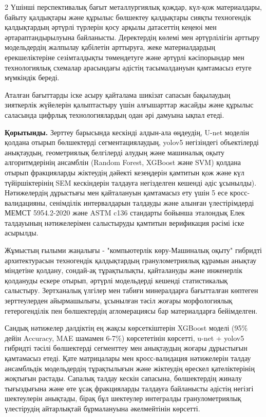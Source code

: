 \begin{multicols}{2}
Үшінші перспективалық бағыт металлургиялық қождар, күл-қож материалдары,
байыту қалдықтары және құрылыс бөлшектеу қалдықтары сияқты техногендік
қалдықтардың әртүрлі түрлерін қосу арқылы датасеттің кеңеюі мен
әртараптандырылуына байланысты. Деректердің көлемі мен әртүрлілігін
арттыру модельдердің жалпылау қабілетін арттыруға, жеке материалдардың
ерекшеліктеріне сезімталдықты төмендетуге және әртүрлі кәсіпорындар мен
технологиялық схемалар арасындағы әдістің тасымалдануын қамтамасыз етуге
мүмкіндік береді.

Аталған бағыттарды іске асыру қайталама шикізат сапасын бақылаудың
зияткерлік жүйелерін қалыптастыру үшін алғышарттар жасайды және құрылыс
саласында цифрлық технологиялардың одан әрі дамуына ықпал етеді.

{\bfseries Қорытынды.} Зерттеу барысында кескінді алдын-ала өңдеудің, U-net
моделін қолдана отырып бөлшектерді сегментациялаудың, yolov5 негізіндегі
объектілерді анықтаудың, геометриялық белгілерді алудың және машиналық
оқыту алгоритмдерінің ансамблін (Random Forest, XGBoost және SVM)
қолдана отырып фракцияларды жіктеудің дәйекті кезеңдерін қамтитын қож
және күл түйіршіктерінің SEM кескіндерін талдауға негізделген кешенді
әдіс ұсынылды). Нәтижелердің дұрыстығы мен қайталануын қамтамасыз ету
үшін 5 есе кросс-валидацияны, сенімділік интервалдарын талдауды және
алынған үлестірімдерді МЕМСТ 5954.2-2020 және ASTM c136 стандарты
бойынша эталондық Елек талдауының нәтижелерімен салыстыруды қамтитын
верификация рәсімі іске асырылды.

Жұмыстың ғылыми жаңалығы - "компьютерлік көру-Машиналық оқыту" гибридті
архитектурасын техногендік қалдықтардың гранулометриялық құрамын анықтау
міндетіне қолдану, сондай-ақ тұрақтылықты, қайталануды және инженерлік
қолдануды ескере отырып, әртүрлі модельдерді кешенді статистикалық
салыстыру. Зертханалық үлгілер мен табиғи минералдарға бағытталған
көптеген зерттеулерден айырмашылығы, ұсынылған тәсіл жоғары
морфологиялық гетерогенділік пен бөлшектердің агломерациясы бар
материалдарға бейімделген.

Сандық нәтижелер дәлдіктің ең жақсы көрсеткіштерін XGBoost моделі (95\%
дейін Accuracy, MAE шамамен 6-7\%) көрсететінін көрсетті, u-net + yolov5
гибридті тәсілі бөлшектерді сегменттеу мен анықтаудың жоғары дұрыстығын
қамтамасыз етеді. Қате матрицалары мен кросс-валидация нәтижелерін
талдау ансамбльдік модельдердің тұрақтылығын және жіктеудің өрескел
қателіктерінің жоқтығын растады. Сапалық талдау кескін сапасына,
бөлшектердің жиналу тығыздығына және өте ұсақ фракцияларды талдауға
байланысты әдістің негізгі шектеулерін анықтады, бірақ бұл шектеулер
интегралды гранулометриялық үлестірудің айтарлықтай бұрмалануына
әкелмейтінін көрсетті.


\end{multicols}
